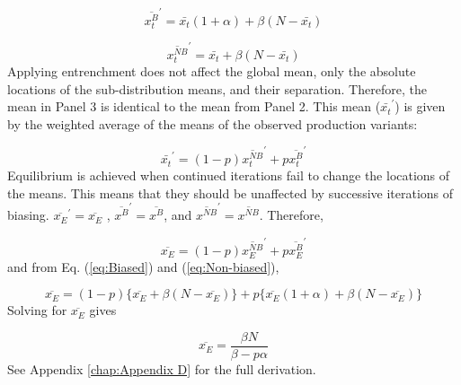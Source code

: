 \begin{equation}
\overline{x_{t}^{B}}^{\prime}=\bar{x_{t}}(1+\alpha)+\beta(N-\bar{x_{t}})\label{eq:Biased}
\end{equation}

\begin{equation}
\overline{x_{t}^{NB}}^{\prime}=\bar{x_{t}}+\beta(N-\bar{x_{t}})\label{eq:Non-biased}
\end{equation}
Applying entrenchment does not affect the global mean, only the absolute
locations of the sub-distribution means, and their separation. Therefore,
the mean in Panel 3 is identical to the mean from Panel 2. This mean
($\bar{x_{t}}^{\prime}$) is given by the weighted average of the
means of the observed production variants: 

\begin{equation}
\bar{x_{t}}^{\prime}=(1-p)\overline{x_{t}^{NB}}^{\prime}+p\overline{x_{t}^{B}}^{\prime}\label{eq: G weighted mean}
\end{equation}
Equilibrium is achieved when continued iterations fail to change the
locations of the means. This means that they should be unaffected
by successive iterations of biasing. $\overline{x_{E}}^{\prime}=\overline{x_{E}}$
, $\overline{x^{B}}^{\prime}=\overline{x^{B}}$, and $\overline{x^{NB}}^{\prime}=\overline{x^{NB}}$.
Therefore, 

\begin{equation}
\overline{x_{E}}=(1-p)\overline{x_{E}^{NB}}^{\prime}+p\overline{x_{E}^{B}}^{\prime}\label{eq:equilbrium 1}
\end{equation}
and from Eq. (\ref{eq:Biased}) and (\ref{eq:Non-biased}), 

\begin{equation}
\overline{x_{E}}=(1-p)\{\overline{x_{E}}+\beta(N-\overline{x_{E}})\}+p\{\overline{x_{E}}(1+\alpha)+\beta(N-\overline{x_{E}})\}\label{eq:equilbrium 2}
\end{equation}
Solving for $\overline{x_{E}}$ gives

\begin{equation}
\overline{x_{E}}=\frac{\beta N}{\beta-p\alpha}\label{eq: lengthening process}
\end{equation}
See Appendix \ref{chap:Appendix D} for the full derivation. 

